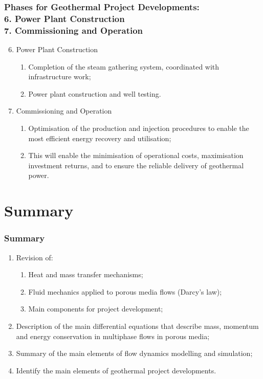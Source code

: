 \documentclass[10pt,compress]{beamer}
\begin{document}
\begin{frame}
 \frametitle{Phases for Geothermal Project Developments: \\ 6. Power Plant Construction \\ 7. Commissioning and Operation }
    \begin{enumerate}[1]\setcounter{enumi}{5}
       \item <1-> Power Plant Construction
         \begin{enumerate}[{6.}1]
           \item<1-> Completion of the steam gathering system, coordinated with infrastructure work;
           \item<1-> Power plant construction and well testing.
         \end{enumerate}
       \item <2-> Commissioning and Operation
         \begin{enumerate}[{7.}1]
           \item<2-> Optimisation of the production and injection procedures to enable the most efficient energy recovery and utilisation;
           \item<2-> This will enable the minimisation of operational costs, maximisation investment returns, and to ensure the reliable delivery of geothermal power.
         \end{enumerate}
    \end{enumerate}
\end{frame}
 












\section{Summary}
\begin{frame}
 \frametitle{Summary}
  \begin{enumerate}[1.]
%
     \item <1-> Revision of:
         \begin{enumerate}[{1.}a)]
             \item <1-> Heat and mass transfer mechanisms;
             \item <1-> Fluid mechanics applied to porous media flows (Darcy's law);
             \item <1-> Main components for project development;
         \end{enumerate}
     \item <2-> Description of the main differential equations that describe mass, momentum and energy conservation in multiphase flows in porous media;
     \item <3-> Summary of the main elements of flow dynamics modelling and simulation;
     \item <4-> Identify the main elements of geothermal project developments.
%
  \end{enumerate}
\end{frame}
\end{document}
